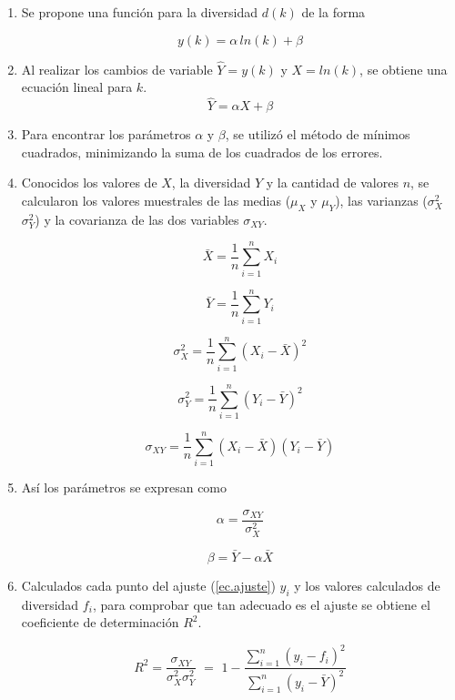\begin{enumerate}
	\item Se propone una función para la diversidad $d(k)$ de la forma
	
	\begin{equation}
	\label{ec.ajuste}
	y(k) =  \alpha \, ln(k) + \beta
	\end{equation}
	
	\item Al realizar los cambios de variable $\hat{Y} = y(k)$ y $X = ln(k)$, se obtiene una ecuación lineal para $k$.
	$$ \hat{Y} =  \alpha X + \beta$$
	
	\item Para encontrar los parámetros $\alpha$ y $\beta$, se utilizó el método de mínimos cuadrados, minimizando la suma de los cuadrados de los errores.  
	
	\item Conocidos los valores de $X$, la diversidad $Y$ y la cantidad de valores $n$,  se calcularon los valores muestrales de las medias ($\mu_{X}$ y $\mu_{Y}$), las varianzas ($\sigma^{2}_{X}$ $\sigma^{2}_{Y}$)  y la covarianza de las dos variables  $\sigma_{XY}$.
	
	$$ \bar{X} = \frac{1}{n} \sum_{i=1}^{n} X_{i} $$
	
	$$ \bar{Y} = \frac{1}{n} \sum_{i=1}^{n} Y_{i} $$
	
	$$ \sigma^{2}_{X} = \frac{1}{n} \sum_{i=1}^{n} \left (X_{i} -\bar{X}\right )^{2} $$
	
	$$ \sigma^{2}_{Y} = \frac{1}{n} \sum_{i=1}^{n} \left (Y_{i} -\bar{Y}\right )^{2} $$
	
	$$ \sigma_{XY} = \frac{1}{n} \sum_{i=1}^{n} \left (X_{i} - \bar{X}\right )  \left (Y_{i} - \bar{Y} \right ) $$
	
	\item Así los parámetros se expresan como
	
	$$ \alpha = \frac{\sigma_{XY}}{\sigma^{2}_{X}} $$
	
	$$ \beta = \bar{Y} - \alpha \bar{X}$$
	
	\item Calculados cada punto del ajuste (\ref{ec.ajuste}) $y_{i}$ y los valores calculados de diversidad $f_{i}$, para comprobar que tan adecuado es el ajuste se obtiene el coeficiente de determinación $R^{2}$.
	
	\begin{equation}
	\label{ec.rcuadrado}
	R^{2} = \frac{\sigma_{XY}}{\sigma^{2}_{X} \sigma^{2}_{Y}} \,\, = \,\, 1- \frac{\sum_{i=1}^{n} \left( y_{i} - f_{i}\right)^{2} }{\sum_{i=1}^{n} \left (y_{i} -\bar{Y}\right )^{2}}
	\end{equation}
	
	
	 
\end{enumerate}


